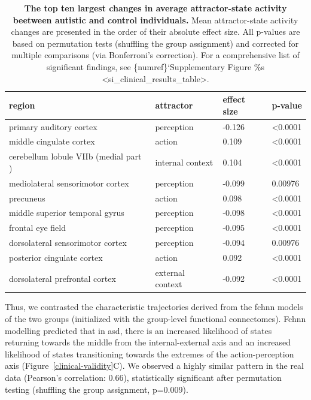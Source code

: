\documentclass{article}
\begin{document}
\begin{table}
\centering
\caption[]{\textbf{The top ten largest changes in average attractor-state activity beetween autistic and control individuals.}  Mean attractor-state activity changes are presented in the order of their absolute effect size. All p-values are based on permutation tests (shuffling the group assignment) and corrected for multiple comparisons (via Bonferroni's correction). For a comprehensive list of significant findings, see \{numref\}`Supplementary Figure \%s \textless si\_clinical\_results\_table\textgreater .}
\label{tab-clinical-results}
\begin{tabular}{p{}p{}p{}p{}}
\toprule
region & attractor & effect size & p-value \\
\hline
primary auditory cortex & perception & -0.126 & \textless 0.0001 \\
mid\acrshort{dl}e cingulate cortex & action & 0.109 & \textless 0.0001 \\
cerebellum lobule VIIb (medial part  ) & internal context & 0.104 & \textless 0.0001 \\
mediolateral sensorimotor cortex & perception & -0.099 & 0.00976 \\
precuneus & action & 0.098 & \textless 0.0001 \\
mid\acrshort{dl}e superior temporal gyrus & perception & -0.098 & \textless 0.0001 \\
frontal eye field & perception & -0.095 & \textless 0.0001 \\
dorsolateral sensorimotor cortex & perception & -0.094 & 0.00976 \\
posterior cingulate cortex & action & 0.092 & \textless 0.0001 \\
dorsolateral prefrontal cortex & external context & -0.092 & \textless 0.0001 \\
\bottomrule
\end{tabular}
\end{table}

Thus, we contrasted the characteristic trajectories derived from the \acrshort{fchnn} models of the two groups (initialized with the group-level functional connectomes). Fc\acrshort{hnn} modelling predicted that in \acrshort{asd}, there is an increased likelihood of states returning towards the mid\acrshort{dl}e from the internal-external axis and an increased likelihood of states transitioning towards the extremes of the action-perception axis (Figure~\ref{clinical-validity}C). We observed a highly similar pattern in the real data (Pearson's correlation: 0.66), statistically significant after permutation testing (shuffling the group assignment, p=0.009).
\end{document}
